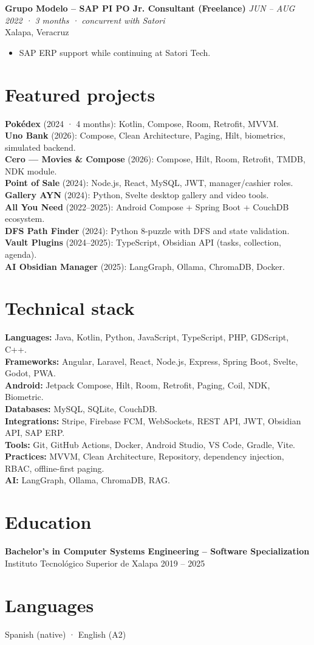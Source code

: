 \documentclass[letterpaper,10pt]{article}
\begin{document}
\textbf{Grupo Modelo -- SAP PI PO Jr. Consultant (Freelance)} \hfill \textit{JUN -- AUG 2022 · 3 months · concurrent with Satori}\\
Xalapa, Veracruz
\begin{itemize}
    \item SAP ERP support while continuing at Satori Tech.
\end{itemize}

\section*{Featured projects}
\textbf{Pokédex} (2024 · 4 months): Kotlin, Compose, Room, Retrofit, MVVM.\\
\textbf{Uno Bank} (2026): Compose, Clean Architecture, Paging, Hilt, biometrics, simulated backend.\\
\textbf{Cero — Movies \& Compose} (2026): Compose, Hilt, Room, Retrofit, TMDB, NDK module.\\
\textbf{Point of Sale} (2024): Node.js, React, MySQL, JWT, manager/cashier roles.\\
\textbf{Gallery AYN} (2024): Python, Svelte desktop gallery and video tools.\\
\textbf{All You Need} (2022--2025): Android Compose + Spring Boot + CouchDB ecosystem.\\
\textbf{DFS Path Finder} (2024): Python 8-puzzle with DFS and state validation.\\
\textbf{Vault Plugins} (2024--2025): TypeScript, Obsidian API (tasks, collection, agenda).\\
\textbf{AI Obsidian Manager} (2025): LangGraph, Ollama, ChromaDB, Docker.

\section*{Technical stack}
\textbf{Languages:} Java, Kotlin, Python, JavaScript, TypeScript, PHP, GDScript, C++.\\
\textbf{Frameworks:} Angular, Laravel, React, Node.js, Express, Spring Boot, Svelte, Godot, PWA.\\
\textbf{Android:} Jetpack Compose, Hilt, Room, Retrofit, Paging, Coil, NDK, Biometric.\\
\textbf{Databases:} MySQL, SQLite, CouchDB.\\
\textbf{Integrations:} Stripe, Firebase FCM, WebSockets, REST API, JWT, Obsidian API, SAP ERP.\\
\textbf{Tools:} Git, GitHub Actions, Docker, Android Studio, VS Code, Gradle, Vite.\\
\textbf{Practices:} MVVM, Clean Architecture, Repository, dependency injection, RBAC, offline-first paging.\\
\textbf{AI:} LangGraph, Ollama, ChromaDB, RAG.

\section*{Education}
\textbf{Bachelor's in Computer Systems Engineering -- Software Specialization}\\
Instituto Tecnológico Superior de Xalapa \hfill 2019 -- 2025

\section*{Languages}
Spanish (native) · English (A2)
\end{document}
